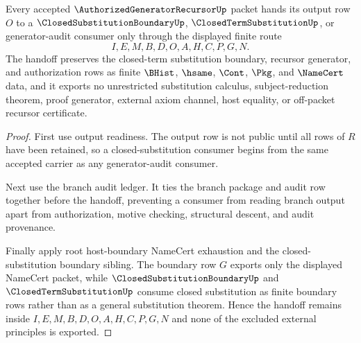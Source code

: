 \begin{theorem}
\label{thm:authorized-generator-recursor-closed-substitution-handoff}
Every accepted $\AuthorizedGeneratorRecursorUp$ packet hands its output row $O$ to a $\ClosedSubstitutionBoundaryUp$, $\ClosedTermSubstitutionUp$, or generator-audit consumer only through the displayed finite route
$$
I,E,M,B,D,O,A,H,C,P,G,N.
$$
The handoff preserves the closed-term substitution boundary, recursor generator, and authorization rows as finite $\BHist$, $\hsame$, $\Cont$, $\Pkg$, and $\NameCert$ data, and it exports no unrestricted substitution calculus, subject-reduction theorem, proof generator, external axiom channel, host equality, or off-packet recursor certificate.
\end{theorem}
\begin{proof}
First use output readiness. The output row is not public until all rows of $R$ have been retained, so a closed-substitution consumer begins from the same accepted carrier as any generator-audit consumer.

Next use the branch audit ledger. It ties the branch package and audit row together before the handoff, preventing a consumer from reading branch output apart from authorization, motive checking, structural descent, and audit provenance.

Finally apply root host-boundary NameCert exhaustion and the closed-substitution boundary sibling. The boundary row $G$ exports only the displayed NameCert packet, while $\ClosedSubstitutionBoundaryUp$ and $\ClosedTermSubstitutionUp$ consume closed substitution as finite boundary rows rather than as a general substitution theorem. Hence the handoff remains inside $I,E,M,B,D,O,A,H,C,P,G,N$ and none of the excluded external principles is exported.
\end{proof}

